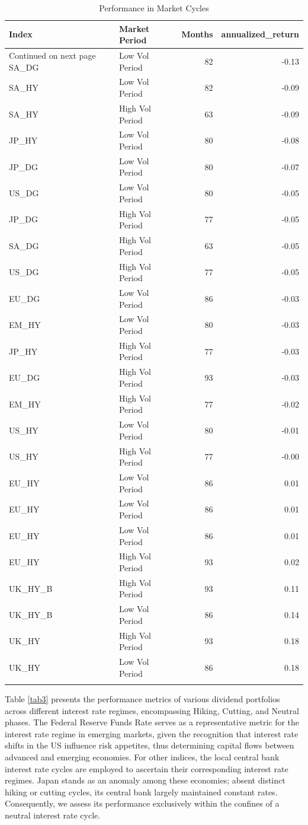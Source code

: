 \documentclass[11pt,preprint, authoryear]{elsarticle}
\numberwithin{equation}{section}
\numberwithin{figure}{section}
\numberwithin{table}{section}
\begin{document}
\begingroup\fontsize{12pt}{13pt}\selectfont
\begin{longtable}{llrr}
  \toprule
Index & Market Period & Months & annualized\_return \\ 
  \hline 
\endhead 
\hline 
{\footnotesize Continued on next page} 
\endfoot 
\endlastfoot 
 \midrule
SA\_DG & Low Vol Period &  82 & -0.13 \\ 
  SA\_HY & Low Vol Period &  82 & -0.09 \\ 
  SA\_HY & High Vol Period &  63 & -0.09 \\ 
  JP\_HY & Low Vol Period &  80 & -0.08 \\ 
  JP\_DG & Low Vol Period &  80 & -0.07 \\ 
  US\_DG & Low Vol Period &  80 & -0.05 \\ 
  JP\_DG & High Vol Period &  77 & -0.05 \\ 
  SA\_DG & High Vol Period &  63 & -0.05 \\ 
  US\_DG & High Vol Period &  77 & -0.05 \\ 
  EU\_DG & Low Vol Period &  86 & -0.03 \\ 
  EM\_HY & Low Vol Period &  80 & -0.03 \\ 
  JP\_HY & High Vol Period &  77 & -0.03 \\ 
  EU\_DG & High Vol Period &  93 & -0.03 \\ 
  EM\_HY & High Vol Period &  77 & -0.02 \\ 
  US\_HY & Low Vol Period &  80 & -0.01 \\ 
  US\_HY & High Vol Period &  77 & -0.00 \\ 
  EU\_HY & Low Vol Period &  86 & 0.01 \\ 
  EU\_HY & Low Vol Period &  86 & 0.01 \\ 
  EU\_HY & Low Vol Period &  86 & 0.01 \\ 
  EU\_HY & High Vol Period &  93 & 0.02 \\ 
  UK\_HY\_B & High Vol Period &  93 & 0.11 \\ 
  UK\_HY\_B & Low Vol Period &  86 & 0.14 \\ 
  UK\_HY & High Vol Period &  93 & 0.18 \\ 
  UK\_HY & Low Vol Period &  86 & 0.18 \\ 
   \bottomrule
\caption{Performance in Market Cycles\label{tab2}} 
\end{longtable}
\endgroup

Table \ref{tab3} presents the performance metrics of various dividend
portfolios across different interest rate regimes, encompassing Hiking,
Cutting, and Neutral phases. The Federal Reserve Funds Rate serves as a
representative metric for the interest rate regime in emerging markets,
given the recognition that interest rate shifts in the US influence risk
appetites, thus determining capital flows between advanced and emerging
economies. For other indices, the local central bank interest rate
cycles are employed to ascertain their corresponding interest rate
regimes. Japan stands as an anomaly among these economies; absent
distinct hiking or cutting cycles, its central bank largely maintained
constant rates. Consequently, we assess its performance exclusively
within the confines of a neutral interest rate cycle.
\end{document}
